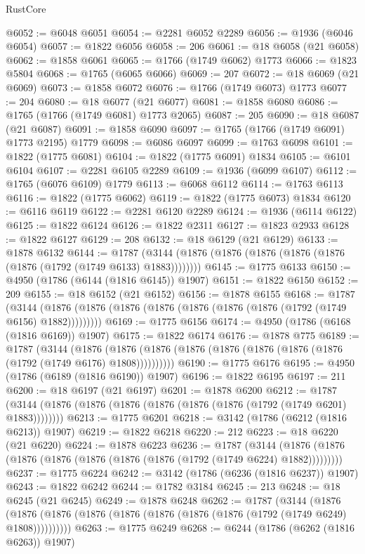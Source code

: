 \begin{lexlean}{RustCore}
\begin{coremodule}
@6052 := @6048 @6051
@6054 := @2281 @6052 @2289
@6056 := @1936 (@6046 @6054)
@6057 := @1822 @6056
@6058 := 206
@6061 := @18 @6058 (@21 @6058)
@6062 := @1858 @6061
@6065 := @1766 (@1749 @6062) @1773
@6066 := @1823 @5804
@6068 := @1765 (@6065 @6066)
@6069 := 207
@6072 := @18 @6069 (@21 @6069)
@6073 := @1858 @6072
@6076 := @1766 (@1749 @6073) @1773
@6077 := 204
@6080 := @18 @6077 (@21 @6077)
@6081 := @1858 @6080
@6086 := @1765 (@1766 (@1749 @6081) @1773 @2065)
@6087 := 205
@6090 := @18 @6087 (@21 @6087)
@6091 := @1858 @6090
@6097 := @1765 (@1766 (@1749 @6091) @1773 @2195) @1779
@6098 := @6086 @6097
@6099 := @1763 @6098
@6101 := @1822 (@1775 @6081)
@6104 := @1822 (@1775 @6091) @1834
@6105 := @6101 @6104
@6107 := @2281 @6105 @2289
@6109 := @1936 (@6099 @6107)
@6112 := @1765 (@6076 @6109) @1779
@6113 := @6068 @6112
@6114 := @1763 @6113
@6116 := @1822 (@1775 @6062)
@6119 := @1822 (@1775 @6073) @1834
@6120 := @6116 @6119
@6122 := @2281 @6120 @2289
@6124 := @1936 (@6114 @6122)
@6125 := @1822 @6124
@6126 := @1822 @2311
@6127 := @1823 @2933
@6128 := @1822 @6127
@6129 := 208
@6132 := @18 @6129 (@21 @6129)
@6133 := @1878 @6132
@6144 := @1787 (@3144 (@1876 (@1876 (@1876 (@1876 (@1876 (@1876 (@1792 (@1749 @6133) @1883))))))))
@6145 := @1775 @6133
@6150 := @4950 (@1786 (@6144 (@1816 @6145)) @1907)
@6151 := @1822 @6150
@6152 := 209
@6155 := @18 @6152 (@21 @6152)
@6156 := @1878 @6155
@6168 := @1787
    (@3144 (@1876 (@1876 (@1876 (@1876 (@1876 (@1876 (@1876 (@1792 (@1749 @6156) @1882)))))))))
@6169 := @1775 @6156
@6174 := @4950 (@1786 (@6168 (@1816 @6169)) @1907)
@6175 := @1822 @6174
@6176 := @1878 @775
@6189 := @1787
    (@3144
      (@1876 (@1876 (@1876 (@1876 (@1876 (@1876 (@1876 (@1876 (@1792 (@1749 @6176) @1808))))))))))
@6190 := @1775 @6176
@6195 := @4950 (@1786 (@6189 (@1816 @6190)) @1907)
@6196 := @1822 @6195
@6197 := 211
@6200 := @18 @6197 (@21 @6197)
@6201 := @1878 @6200
@6212 := @1787 (@3144 (@1876 (@1876 (@1876 (@1876 (@1876 (@1876 (@1792 (@1749 @6201) @1883))))))))
@6213 := @1775 @6201
@6218 := @3142 (@1786 (@6212 (@1816 @6213)) @1907)
@6219 := @1822 @6218
@6220 := 212
@6223 := @18 @6220 (@21 @6220)
@6224 := @1878 @6223
@6236 := @1787
    (@3144 (@1876 (@1876 (@1876 (@1876 (@1876 (@1876 (@1876 (@1792 (@1749 @6224) @1882)))))))))
@6237 := @1775 @6224
@6242 := @3142 (@1786 (@6236 (@1816 @6237)) @1907)
@6243 := @1822 @6242
@6244 := @1782 @3184
@6245 := 213
@6248 := @18 @6245 (@21 @6245)
@6249 := @1878 @6248
@6262 := @1787
    (@3144
      (@1876 (@1876 (@1876 (@1876 (@1876 (@1876 (@1876 (@1876 (@1792 (@1749 @6249) @1808))))))))))
@6263 := @1775 @6249
@6268 := @6244 (@1786 (@6262 (@1816 @6263)) @1907)

\end{coremodule}
\end{lexlean}
